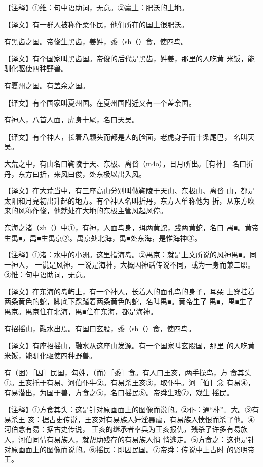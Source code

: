 \documentclass[a4paper,12pt,UTF8,twoside]{ctexbook}
\begin{document}
【注释】①维：句中语助词，无意。②嬴土：肥沃的土地。

【译文】有一群人被称作柔仆民，他们所在的国土很肥沃。

有黑齿之国。帝俊生黑齿，姜姓，黍（sh（）食，使四鸟。

【译文】有个国家叫黑齿国。帝俊的后代是黑齿，姓姜，那里的人吃黄 米饭，能驯化驱使四种野兽。

有夏州之国。有盖余之国。

【译文】有个国家叫夏州国。在夏州国附近又有一个盖余国。

有神人，八首人面，虎身十尾，名曰天吴。

【译文】有个神人，长着八颗头而都是人的脸面，老虎身子而十条尾巴， 名叫天吴。

大荒之中，有山名曰鞠陵于天、东极、离瞀（m4o），日月所出。［有神］ 名曰折丹，东方曰折，来风曰俊，处东极以出入风。

【译文】在大荒当中，有三座高山分别叫做鞠陵于天山、东极山、离瞀 山，都是太阳和月亮初出升起的地方。有个神人名叫折丹，东方人单称他为 折，从东方吹来的风称作俊，他就处在大地的东极主管风起风停。

东海之渚（zh（）中①，有神，人面鸟身，珥两黄蛇，践两黄蛇，名曰 禺■。黄帝生禺■，禺■生禺京②。禺京处北海，禺■处东海，是惟海神③。

【注释】①渚：水中的小洲。这里指海岛。②禺京：就是上文所说的风神禺■。同一神人， 一说是风神，一说是海神，大概因神话传说不同，或为一身而兼二职。③惟：句中语助词，无意。

【译文】在东海的岛屿上，有一个神人，长着人的面孔鸟的身子，耳朵 上穿挂着两条黄色的蛇，脚底下踩踏着两条黄色的蛇，名叫禺■。黄帝生了 禺■，禺■生了禺京。禺京住在北海，禺■住在东海，都是海神。

有招摇山，融水出焉。有国曰玄股，黍（sh（）食，使四鸟。

【译文】有座招摇山，融水从这座山发源。有一个国家叫玄股国，那里 的人吃黄米饭，能驯化驱使四种野兽。

有（困）［因］民国，勾姓，（而）［黍］食。有人曰王亥，两手操鸟，方 食其头①。王亥托于有易、河伯仆牛②。有易杀王亥③，取仆牛。河［伯］念 有易④，有易潜出，为国于兽，方食之⑤，名曰摇民⑥。帝舜生戏⑦，戏生 摇民。

【注释】①方食其头：这是针对原画面上的图像而说的。②仆：通“朴”。大。③有易杀王 亥：据古史传说，王亥对有易族人奸淫暴虐，有易族人愤恨而杀了他。④河伯念有易：据古史传说， 王亥的继承者率兵为王亥报仇，残杀了许多有易族人，河伯同情有易族人，就帮助残存的有易族人悄 悄逃走。⑤方食之：这也是针对原画面上的图像而说的。⑥摇民：即因民国。⑦帝舜：传说中上古时 的贤明帝王。
\end{document}
